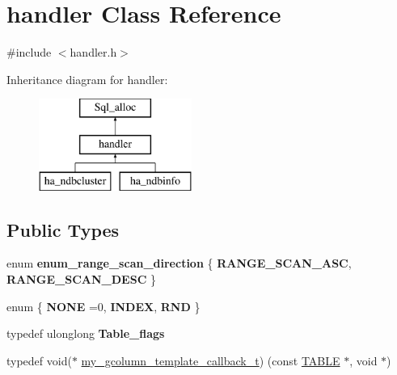 \hypertarget{classhandler}{}\section{handler Class Reference}
\label{classhandler}


{\ttfamily \#include $<$handler.\+h$>$}

Inheritance diagram for handler\+:\begin{figure}[H]
\begin{center}
\leavevmode
\includegraphics[height=3.000000cm]{classhandler}
\end{center}
\end{figure}
\subsection*{Public Types}
\begin{DoxyCompactItemize}
\item 
\mbox{\label{classhandler_ab5b14b11876fb5ac53a4cc7aceea6a2d}} 
enum {\bfseries enum\+\_\+range\+\_\+scan\+\_\+direction} \{ {\bfseries R\+A\+N\+G\+E\+\_\+\+S\+C\+A\+N\+\_\+\+A\+SC}, 
{\bfseries R\+A\+N\+G\+E\+\_\+\+S\+C\+A\+N\+\_\+\+D\+E\+SC}
 \}
\item 
\mbox{\label{classhandler_ab68580c3751fc08427f5ac48ef4b2d69}} 
enum \{ {\bfseries N\+O\+NE} =0, 
{\bfseries I\+N\+D\+EX}, 
{\bfseries R\+ND}
 \}
\item 
\mbox{\label{classhandler_a67af5473a36655c922682399d4c5b6ec}} 
typedef ulonglong {\bfseries Table\+\_\+flags}
\item 
typedef void($\ast$ \mbox{\hyperlink{classhandler_ad4c241e50948859d98ceae6e39066838}{my\+\_\+gcolumn\+\_\+template\+\_\+callback\+\_\+t}}) (const \mbox{\hyperlink{structTABLE}{T\+A\+B\+LE}} $\ast$, void $\ast$)
\end{DoxyCompactItemize}
